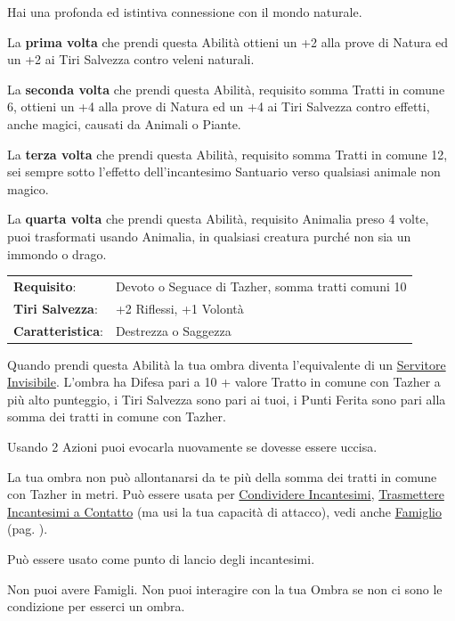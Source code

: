 \begin{multicols}{2}
Hai una profonda ed istintiva connessione con il mondo naturale.

La \textbf{prima volta} che prendi questa Abilità ottieni un +2 alla prove di Natura ed un +2 ai Tiri Salvezza contro veleni naturali.

La \textbf{seconda volta} che prendi questa Abilità, requisito somma Tratti in comune 6, ottieni un +4 alla prove di Natura ed un +4 ai Tiri Salvezza contro effetti, anche magici, causati da Animali o Piante.

La \textbf{terza volta} che prendi questa Abilità, requisito somma Tratti in comune 12, sei sempre sotto l'effetto dell'incantesimo Santuario verso qualsiasi animale non magico.

La \textbf{quarta volta} che prendi questa Abilità, requisito Animalia preso 4 volte, puoi trasformati usando Animalia, in qualsiasi creatura purché non sia un immondo o drago.

\noindent\begin{tabularx}{\linewidth}{>{\raggedright\arraybackslash}p{2.5cm}X}
\rowcolor{gray!20}\textbf{Requisito}: & Devoto o Seguace di Tazher, somma tratti comuni 10\\
\textbf{Tiri Salvezza}: & +2 Riflessi, +1 Volontà\\
\rowcolor{gray!20}\textbf{Caratteristica}: & Destrezza o Saggezza\\
\end{tabularx}\smallskip

Quando prendi questa Abilità la tua ombra diventa l'equivalente di un \hyperlink{Servitore Invisibile}{Servitore Invisibile}.
L'ombra ha Difesa pari a 10 + valore Tratto in comune con Tazher a più alto punteggio, i Tiri Salvezza sono pari ai tuoi, i Punti Ferita sono pari alla somma dei tratti in comune con Tazher.

Usando 2 Azioni puoi evocarla nuovamente se dovesse essere uccisa.

La tua ombra non può allontanarsi da te più della somma dei tratti in comune con Tazher in metri. Può essere usata per \hyperlink{Condividere Incantesimi}{Condividere Incantesimi}, \hyperlink{Trasmettere Incantesimi a Contatto}{Trasmettere Incantesimi a Contatto} (ma usi la tua capacità di attacco), vedi anche \hyperlink{famiglio}{Famiglio} (pag. \pageref{famiglio}).

Può essere usato come punto di lancio degli incantesimi.

Non puoi avere Famigli. Non puoi interagire con la tua Ombra se non ci sono le condizione per esserci un ombra.


\end{multicols}
